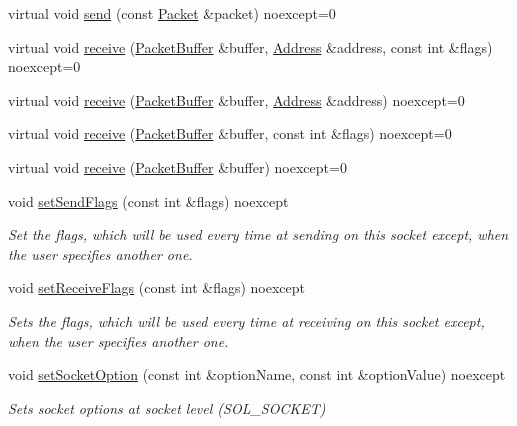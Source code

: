 \begin{DoxyCompactItemize}
\item 
virtual void \hyperlink{classtnnf_1_1_socket_a21df1f81d8104d3387d608059e16eb67}{send} (const \hyperlink{classtnnf_1_1_packet}{Packet} \&packet) noexcept=0
\item 
virtual void \hyperlink{classtnnf_1_1_socket_a0366ede12a56573b51e02c9a80b32595}{receive} (\hyperlink{classtnnf_1_1_packet_buffer}{Packet\+Buffer} \&buffer, \hyperlink{classtnnf_1_1_address}{Address} \&address, const int \&flags) noexcept=0
\item 
virtual void \hyperlink{classtnnf_1_1_socket_ab732e38ca26568402dba2cfa71601f6a}{receive} (\hyperlink{classtnnf_1_1_packet_buffer}{Packet\+Buffer} \&buffer, \hyperlink{classtnnf_1_1_address}{Address} \&address) noexcept=0
\item 
virtual void \hyperlink{classtnnf_1_1_socket_a5f6671174f679fce6b3e2eea080befe7}{receive} (\hyperlink{classtnnf_1_1_packet_buffer}{Packet\+Buffer} \&buffer, const int \&flags) noexcept=0
\item 
virtual void \hyperlink{classtnnf_1_1_socket_aad6435e91d6fce28068f2aa06980b532}{receive} (\hyperlink{classtnnf_1_1_packet_buffer}{Packet\+Buffer} \&buffer) noexcept=0
\item 
void \hyperlink{classtnnf_1_1_socket_aba7072ffc4c79501f79e2c786b9592cb}{set\+Send\+Flags} (const int \&flags) noexcept
\begin{DoxyCompactList}\small\item\em Set the flags, which will be used every time at sending on this socket except, when the user specifies another one. \end{DoxyCompactList}\item 
void \hyperlink{classtnnf_1_1_socket_a421f890bc6b5c66b7c5d2f8c9df6647a}{set\+Receive\+Flags} (const int \&flags) noexcept
\begin{DoxyCompactList}\small\item\em Sets the flags, which will be used every time at receiving on this socket except, when the user specifies another one. \end{DoxyCompactList}\item 
void \hyperlink{classtnnf_1_1_socket_a26e23ad9deeb5674558c87a99ae0ed57}{set\+Socket\+Option} (const int \&option\+Name, const int \&option\+Value) noexcept
\begin{DoxyCompactList}\small\item\em Sets socket options at socket level (S\+O\+L\+\_\+\+S\+O\+C\+K\+E\+T) \end{DoxyCompactList}\item 

\end{DoxyCompactItemize}
